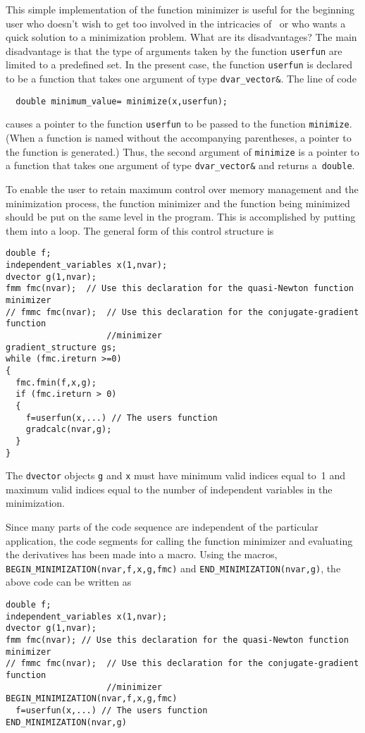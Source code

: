 \documentclass{admbmanual}
\begin{document}
This simple implementation of the function minimizer is useful for the beginning
user who doesn't wish to get too involved in the intricacies of \scAD\ or who
wants a quick solution to a minimization problem. What are its disadvantages?
The main disadvantage is that the type of arguments taken by the function
\texttt{userfun} are limited to a predefined set. In the present case, the
function \texttt{userfun} is declared to be a function that takes one argument
of type \texttt{dvar\_vector\&}. The line of code
\begin{lstlisting}
  double minimum_value= minimize(x,userfun);
\end{lstlisting}
causes a pointer to the function \texttt{userfun} to be passed to the function
\texttt{minimize}. (When a function is named without the accompanying
parentheses, a pointer to the function is generated.) Thus, the second argument
of \texttt{minimize} is a pointer to a function that takes one argument of type
\texttt{dvar\_vector\&} and returns a~\texttt{double}.

To enable the user to retain maximum control over memory management and the
minimization process, the function minimizer and the function being minimized
should be put on the same level in the program. This is accomplished by putting
them into a loop. The general form of this control structure is
\begin{lstlisting}
double f;
independent_variables x(1,nvar);
dvector g(1,nvar);
fmm fmc(nvar);  // Use this declaration for the quasi-Newton function minimizer
// fmmc fmc(nvar);  // Use this declaration for the conjugate-gradient function
                    //minimizer
gradient_structure gs;
while (fmc.ireturn >=0)
{
  fmc.fmin(f,x,g);
  if (fmc.ireturn > 0)
  {
    f=userfun(x,...) // The users function
    gradcalc(nvar,g);
  }
}
\end{lstlisting}

The \texttt{dvector} objects \texttt{g} and \texttt{x} must have minimum valid
indices equal to~1 and maximum valid indices equal to the number of independent
variables in the minimization.

Since many parts of the code sequence are independent of the particular
application, the code segments for calling the function minimizer and evaluating
the derivatives has been made into a macro. Using the macros,
\texttt{BEGIN\_MINIMIZATION(nvar,f,x,g,fmc)} and
\texttt{END\_MINIMIZATION(nvar,g)}, the above code can be written as
\begin{lstlisting}
double f;
independent_variables x(1,nvar);
dvector g(1,nvar);
fmm fmc(nvar); // Use this declaration for the quasi-Newton function minimizer
// fmmc fmc(nvar);  // Use this declaration for the conjugate-gradient function
                    //minimizer
BEGIN_MINIMIZATION(nvar,f,x,g,fmc)
  f=userfun(x,...) // The users function
END_MINIMIZATION(nvar,g)
\end{lstlisting}
\end{document}
